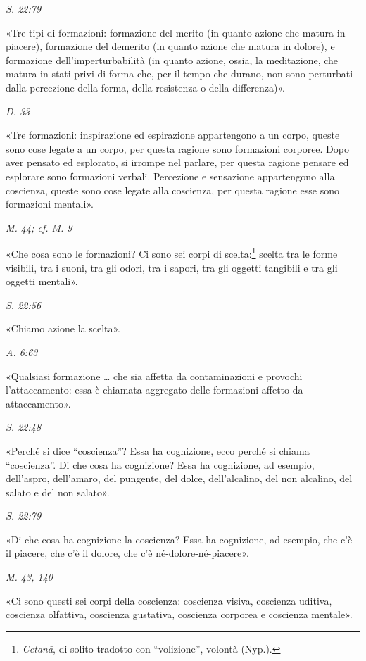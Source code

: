 \emph{S. 22:79}


«Tre tipi di formazioni: formazione del merito (in quanto azione che
matura in piacere), formazione del demerito (in quanto azione che matura
in dolore), e formazione dell’imperturbabilità (in quanto azione, ossia,
la meditazione, che matura in stati privi di forma che, per il tempo che
durano, non sono perturbati dalla percezione della forma, della
resistenza o della differenza)».


\emph{D. 33}


«Tre formazioni: inspirazione ed espirazione appartengono a un corpo,
queste sono cose legate a un corpo, per questa ragione sono formazioni
corporee. Dopo aver pensato ed esplorato, si irrompe nel parlare, per
questa ragione pensare ed esplorare sono formazioni verbali. Percezione
e sensazione appartengono alla coscienza, queste sono cose legate alla
coscienza, per questa ragione esse sono formazioni mentali».


\emph{M. 44; cf. M. 9}


«Che cosa sono le formazioni? Ci sono sei corpi di
scelta:\footnote{\emph{Cetanā}, di solito tradotto con “volizione”, volontà (Nyp.).} scelta tra le forme visibili, tra i suoni, tra
gli odori, tra i sapori, tra gli oggetti tangibili e tra gli oggetti
mentali».


\emph{S. 22:56}


«Chiamo azione la scelta».


\emph{A. 6:63}


«Qualsiasi formazione … che sia affetta da contaminazioni e provochi
l’attaccamento: essa è chiamata aggregato delle formazioni affetto da
attaccamento».


\emph{S. 22:48}


«Perché si dice “coscienza”? Essa ha cognizione, ecco perché si chiama
“coscienza”. Di che cosa ha cognizione? Essa ha cognizione, ad esempio,
dell’aspro, dell’amaro, del pungente, del dolce, dell’alcalino, del non
alcalino, del salato e del non salato».


\emph{S. 22:79}


«Di che cosa ha cognizione la coscienza? Essa ha cognizione, ad esempio,
che c’è il piacere, che c’è il dolore, che c’è né-dolore-né-piacere».


\emph{M. 43, 140}


«Ci sono questi sei corpi della coscienza: coscienza visiva, coscienza
uditiva, coscienza olfattiva, coscienza gustativa, coscienza corporea e
coscienza mentale».


